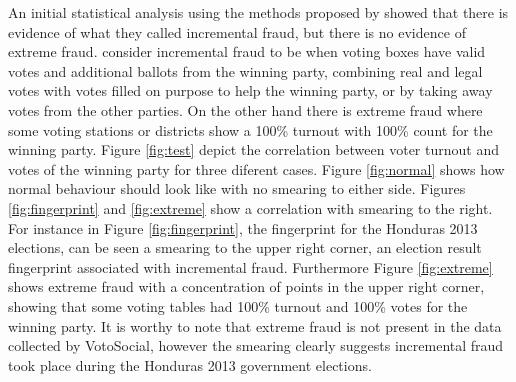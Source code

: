 \documentclass[letterpaper,10pt]{article}
\begin{document}
An initial statistical analysis using the methods proposed by \cite{klimek2012} showed that there is evidence of what they called incremental fraud, but there is no evidence of extreme fraud. \cite{klimek2012} consider incremental fraud to be when voting boxes have valid votes and additional ballots from the winning party, combining real and legal votes with votes filled on purpose to help the winning party, or by taking away votes from the other parties. On the other hand there is extreme fraud where some voting stations or districts show a 100\% turnout with 100\% count for the winning party. Figure \ref{fig:test} depict the correlation between voter turnout and votes of the winning party for three diferent cases. Figure \ref{fig:normal} shows how normal behaviour should look like with no smearing to either side. Figures \ref{fig:fingerprint} and \ref{fig:extreme} show a correlation with smearing to the right. For instance in Figure \ref{fig:fingerprint}, the fingerprint for the Honduras 2013 elections, can be seen a smearing to the upper right corner, an election result fingerprint associated with incremental fraud. Furthermore Figure \ref{fig:extreme} shows extreme fraud with a concentration of points in the upper right corner, showing that some voting tables had 100\% turnout and 100\% votes for the winning party. It is worthy to note that extreme fraud is not present in the data collected by VotoSocial, however the smearing clearly suggests incremental fraud took place during the Honduras 2013 government elections.

\end{document}
